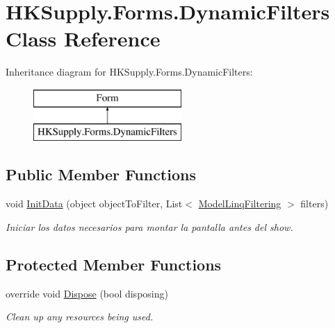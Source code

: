 \hypertarget{class_h_k_supply_1_1_forms_1_1_dynamic_filters}{}\section{H\+K\+Supply.\+Forms.\+Dynamic\+Filters Class Reference}
\label{class_h_k_supply_1_1_forms_1_1_dynamic_filters}
Inheritance diagram for H\+K\+Supply.\+Forms.\+Dynamic\+Filters\+:\begin{figure}[H]
\begin{center}
\leavevmode
\includegraphics[height=2.000000cm]{class_h_k_supply_1_1_forms_1_1_dynamic_filters}
\end{center}
\end{figure}
\subsection*{Public Member Functions}
\begin{DoxyCompactItemize}
\item 
void \mbox{\hyperlink{class_h_k_supply_1_1_forms_1_1_dynamic_filters_a3fb309c2a83dbe6c5826c25007c5336f}{Init\+Data}} (object object\+To\+Filter, List$<$ \mbox{\hyperlink{class_h_k_supply_1_1_forms_1_1_model_linq_filtering}{Model\+Linq\+Filtering}} $>$ filters)
\begin{DoxyCompactList}\small\item\em Iniciar los datos necesarios para montar la pantalla antes del show. \end{DoxyCompactList}\end{DoxyCompactItemize}
\subsection*{Protected Member Functions}
\begin{DoxyCompactItemize}
\item 
override void \mbox{\hyperlink{class_h_k_supply_1_1_forms_1_1_dynamic_filters_a02f9f684c77b0ed2ba2aca58c0b87ec3}{Dispose}} (bool disposing)
\begin{DoxyCompactList}\small\item\em Clean up any resources being used. \end{DoxyCompactList}\end{DoxyCompactItemize}
